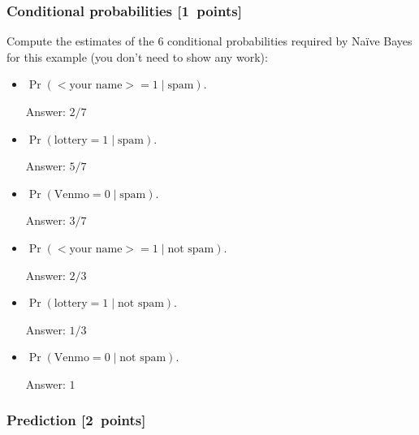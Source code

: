 \documentclass{article}
\newcommand{\blu}[1]{{\textcolor{blu}{#1}}}
\newenvironment{answer}{\par\begingroup\color{gre}Answer: }{\endgroup}
\let\ask\blu
\newcommand\pts[1]{\textcolor{pointscolour}{[#1~points]}}
\begin{document}
    \subsubsection{Conditional probabilities \pts{1}}

    \ask{Compute the estimates of the 6 conditional probabilities required by Na\"ive Bayes for this example}  (you don't need to show any work):
    \begin{itemize}
        \item $\Pr(\text{$<$your name$>$} = 1  \mid \text{spam})$.
        \begin{answer}
            $2/7$
        \end{answer}
        \item $\Pr(\text{lottery} = 1 \mid \text{spam})$.
        \begin{answer}
            $5/7$
        \end{answer}
        \item $\Pr(\text{Venmo} = 0  \mid \text{spam})$.
        \begin{answer}
            $3/7$
        \end{answer}
        \item $\Pr(\text{$<$your name$>$} = 1  \mid \text{not spam})$.
        \begin{answer}
            $2/3$
        \end{answer}
        \item $\Pr(\text{lottery} = 1  \mid \text{not spam})$.
        \begin{answer}
            $1/3$
        \end{answer}
        \item $\Pr(\text{Venmo} = 0  \mid \text{not spam})$.
        \begin{answer}
            $1$
        \end{answer}
    \end{itemize}

    \subsubsection{Prediction \pts{2}}
\end{document}
